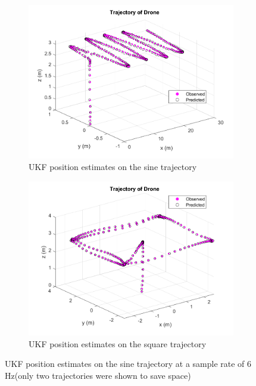 \documentclass[letterpaper, paper,11pt]{AAS}	%
\begin{document}
\begin{figure}[H]
\centering
\begin{subfigure}{.5\textwidth}
	\centering
	\includegraphics[width=\textwidth]{Figures/sine20_traj_UKF}
	\caption{UKF position estimates on the sine trajectory}
	\label{fig:SineUKF}
\end{subfigure}%
\begin{subfigure}{.5\textwidth}
	\centering
	\includegraphics[width=\textwidth]{Figures/square20_traj_UKF}
	\caption{UKF position estimates on the square trajectory}
	\label{fig:SquareErr2}
\end{subfigure}
\caption{UKF position estimates on the sine trajectory at a sample rate of 6 Hz(only two trajectories were shown to save space)}
\label{fig:UKF}
\end{figure}
\end{document}
